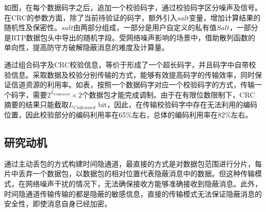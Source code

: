 如图，在每个数据码字之后，追加一个校验码字，通过校验码字区分噪声及信号。在CRC的参数方面，除了当前待验证的码字，额外引入$salt$变量，增加计算结果的随机性及保密性。$salt$由两部分组成，一部分是用户自定义的私有值$Salt$，一部分是RTP数据包头中导出的随机字段。受网络噪声影响的场景中，借助散列函数的单向性，提高防守方破解隐蔽消息的难度及计算量。


通过组合码字及CRC校验信息，等价于形成了一个超长码字，并且码字中自带校验信息。采取数据及校验分别传输的方式，能够有效提高码字的传输效率，同时保证信道资源的利用率。如表，按照一个数据码字对应一个校验码字的方式，传输一个码字，需要$2^{L_{Codeword}}\times 2$个数据包才能完成调制。由于在有限位数限制下，CRC摘要的结果只能截取$L_{Codeword}$ bit，因此，在传输校验码字中存在无法利用的编码位置，因此校验部分的编码利用率在65\%左右，总体的编码利用率在82\%左右。

\subsection{研究动机}
\label{chap:zigzag:motivation:conclude}
通过主动丢包的方式构建时间隐通道，最直接的方式是对数据包范围进行分片，每片中丢弃一个数据包，以数据包的相对位置代表隐蔽消息中的数据。但这种传输模式，在网络噪声干扰的情况下，无法确保接收方能够准确接收到隐蔽消息。此外，时间隐通道传输传输的都是隐蔽的敏感信息，直接的传输模式无法保证隐蔽消息的安全性，即使消息自身已经加密。

